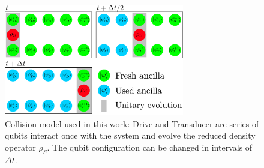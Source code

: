 \begin{figure}
	\centering
	\includegraphics[width=0.7\textwidth]{img/collision_model}
	\caption{Collision model used in this work: Drive and Transducer are series of qubits interact once with the system and evolve the reduced density operator $\rho_S$. The qubit configuration can be changed in intervals of $\Delta t$.}
	\label{collmodel}
\end{figure}